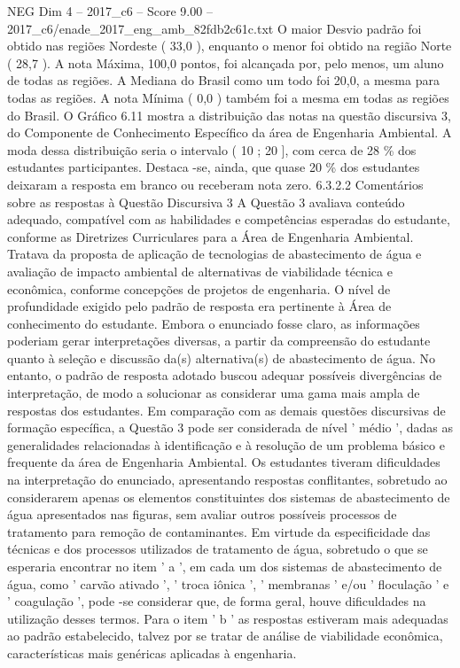 \begin{textsample}{NEG Dim 4 – 2017\_c6 – Score 9.00 – 2017\_c6/enade\_2017\_eng\_amb\_82fdb2c61c.txt}
O maior Desvio padrão foi obtido nas regiões Nordeste ( 33,0 ), enquanto o menor foi obtido na região Norte ( 28,7 ).
A nota Máxima, 100,0 pontos, foi alcançada por, pelo menos, um aluno de todas as regiões.
A Mediana do Brasil como um todo foi 20,0, a mesma para todas as regiões.
A nota Mínima ( 0,0 ) também foi a mesma em todas as regiões do Brasil.
O Gráfico 6.11 mostra a distribuição das notas na questão discursiva 3, do Componente de Conhecimento Específico da área de Engenharia Ambiental.
A moda dessa distribuição seria o intervalo ( 10 ; 20 ], com cerca de 28 \% dos estudantes participantes.
Destaca -se, ainda, que quase 20 \% dos estudantes deixaram a resposta em branco ou receberam nota zero. 6.3.2.2 Comentários sobre as respostas à Questão Discursiva 3 A Questão 3 avaliava conteúdo adequado, compatível com as habilidades e competências esperadas do estudante, conforme as Diretrizes Curriculares para a Área de Engenharia Ambiental.
Tratava da proposta de aplicação de tecnologias de abastecimento de água e avaliação de impacto ambiental de alternativas de viabilidade técnica e econômica, conforme concepções de projetos de engenharia.
O nível de profundidade exigido pelo padrão de resposta era pertinente à Área de conhecimento do estudante.
Embora o enunciado fosse claro, as informações poderiam gerar interpretações diversas, a partir da compreensão do estudante quanto à seleção e discussão da(s) alternativa(s) de abastecimento de água.
No entanto, o padrão de resposta adotado buscou adequar possíveis divergências de interpretação, de modo a solucionar as considerar uma gama mais ampla de respostas dos estudantes.
Em comparação com as demais questões discursivas de formação específica, a Questão 3 pode ser considerada de nível ' médio ', dadas as generalidades relacionadas à identificação e à resolução de um problema básico e frequente da área de Engenharia Ambiental.
Os estudantes tiveram dificuldades na interpretação do enunciado, apresentando respostas conflitantes, sobretudo ao considerarem apenas os elementos constituintes dos sistemas de abastecimento de água apresentados nas figuras, sem avaliar outros possíveis processos de tratamento para remoção de contaminantes.
Em virtude da especificidade das técnicas e dos processos utilizados de tratamento de água, sobretudo o que se esperaria encontrar no item ' a ', em cada um dos sistemas de abastecimento de água, como ' carvão ativado ', ' troca iônica ', ' membranas ' e/ou ' floculação ' e ' coagulação ', pode -se considerar que, de forma geral, houve dificuldades na utilização desses termos.
Para o item ' b ' as respostas estiveram mais adequadas ao padrão estabelecido, talvez por se tratar de análise de viabilidade econômica, características mais genéricas aplicadas à engenharia.

\end{textsample}
